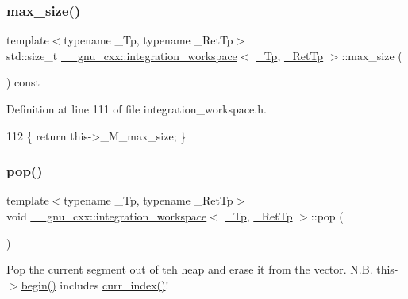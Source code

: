\subsubsection{\texorpdfstring{max\+\_\+size()}{max\_size()}}
{\footnotesize\ttfamily template$<$typename \+\_\+\+Tp, typename \+\_\+\+Ret\+Tp$>$ \\
std\+::size\+\_\+t \hyperlink{class____gnu__cxx_1_1integration__workspace}{\+\_\+\+\_\+gnu\+\_\+cxx\+::integration\+\_\+workspace}$<$ \hyperlink{namespace____gnu__cxx_a3b19a9c800ca194374ef9172290f7d79}{\+\_\+\+Tp}, \hyperlink{namespace____gnu__cxx_a886e03ece3d53ff7fa6c098a40f93fa5}{\+\_\+\+Ret\+Tp} $>$\+::max\+\_\+size (\begin{DoxyParamCaption}{ }\end{DoxyParamCaption}) const\hspace{0.3cm}{\ttfamily [inline]}}



Definition at line 111 of file integration\+\_\+workspace.\+h.


\begin{DoxyCode}
112       \{ \textcolor{keywordflow}{return} this->\_M\_max\_size; \}
\end{DoxyCode}
\mbox{\label{class____gnu__cxx_1_1integration__workspace_a61069f2e98ee9e8b7cfcb88a02bc28ff}} 
\subsubsection{\texorpdfstring{pop()}{pop()}}
{\footnotesize\ttfamily template$<$typename \+\_\+\+Tp, typename \+\_\+\+Ret\+Tp$>$ \\
void \hyperlink{class____gnu__cxx_1_1integration__workspace}{\+\_\+\+\_\+gnu\+\_\+cxx\+::integration\+\_\+workspace}$<$ \hyperlink{namespace____gnu__cxx_a3b19a9c800ca194374ef9172290f7d79}{\+\_\+\+Tp}, \hyperlink{namespace____gnu__cxx_a886e03ece3d53ff7fa6c098a40f93fa5}{\+\_\+\+Ret\+Tp} $>$\+::pop (\begin{DoxyParamCaption}{ }\end{DoxyParamCaption})\hspace{0.3cm}{\ttfamily [inline]}}

Pop the current segment out of teh heap and erase it from the vector. N.\+B. this-\/$>$\hyperlink{class____gnu__cxx_1_1integration__workspace_a9ecef94e75c1bc84e59300fe6504eed9}{begin()} includes \hyperlink{class____gnu__cxx_1_1integration__workspace_a51a384b1777615943add69f1895454f5}{curr\+\_\+index()}! 

